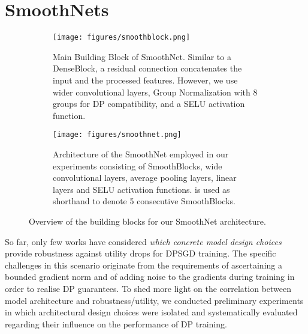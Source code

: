 \documentclass[nohyperref]{article}
\theoremstyle{plain}
\theoremstyle{definition}
\theoremstyle{remark}
\begin{document}
\section{SmoothNets}
\begin{figure*}[ht]
    \centering
    \begin{subfigure}[b]{\textwidth}
    \centering
    \texttt{[image: figures/smoothblock.png]}
    \caption{Main Building Block of SmoothNet. Similar to a DenseBlock, a residual connection concatenates the input and the processed features. However, we use wider convolutional layers, Group Normalization with 8 groups for DP compatibility, and a SELU activation function.}
    \label{fig:smoothblock}
    \end{subfigure}
    \begin{subfigure}[b]{\textwidth}
    \texttt{[image: figures/smoothnet.png]}
    \caption{Architecture of the SmoothNet employed in our experiments consisting of SmoothBlocks, wide convolutional layers, average pooling layers, linear layers and SELU activation functions.  is used as shorthand to denote 5 consecutive SmoothBlocks.}
    \label{fig:smoothnet}
    \end{subfigure}
    \caption{Overview of the building blocks for our SmoothNet architecture.}
    \label{fig:architecture}
\end{figure*}
So far, only few works have considered \textit{which concrete model design choices} provide robustness against utility drops for \acs{DPSGD} training. The specific challenges in this scenario originate from the requirements of ascertaining a bounded gradient norm and of adding noise to the gradients during training in order to realise DP guarantees. To shed more light on the correlation between model architecture and robustness/utility, we conducted preliminary experiments in which architectural design choices were isolated and systematically evaluated regarding their influence on the performance of DP training. 
\end{document}

